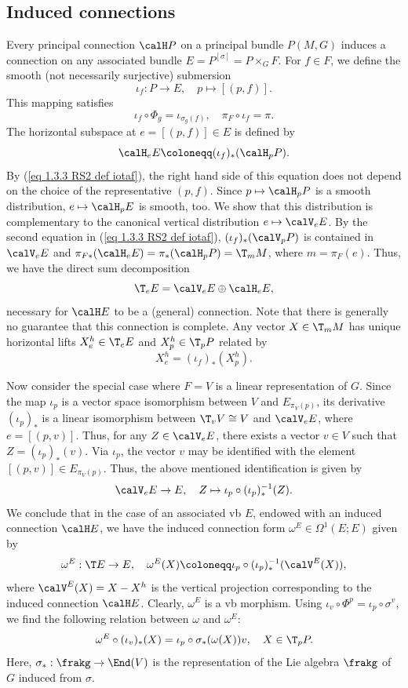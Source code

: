 \subsection{Induced connections}\label{sec: induced connections}


Every principal connection $\calH P$ on a principal bundle $P(M,G)$ induces a connection on any associated bundle $E=P^{[\sigma]}=P\times_G F$. For $f\in F$, we define the smooth (not necessarily surjective) submersion
\[\iota_f:P\to E,\quad p\mapsto [(p,f)].\label{eq 1.3.3 RS2 def iotaf}\]
This mapping satisfies 
\[\iota_f\circ \Phi_g=\iota_{\sigma_g(f)},\quad \pi_F\circ\iota_f=\pi.\]
The horizontal subspace at $e=[(p,f)]\in E$ is defined by
\[\calH_eE\coloneqq (\iota_f)_\ast (\calH_pP).\label{eq 1.3.4 RS2}\]
By (\ref{eq 1.3.3 RS2 def iotaf}), the right hand side of this equation does not depend on the choice of the representative $(p,f)$. Since $p\mapsto \calH_pP$ is a smooth distribution, $e\mapsto \calH_pE$ is smooth, too. We show that this distribution is complementary to the canonical vertical distribution $e\mapsto \calV_eE$. By the second equation in (\ref{eq 1.3.3 RS2 def iotaf}), $(\iota_f)_\ast(\calV_pP)$ is contained in $\calV_eE$ and $\pi_{F\ast}(\calH_eE)=\pi_\ast(\calH_pP)=\T_mM$, where $m=\pi_F(e)$. Thus, we have the direct sum decomposition 
\[\T_eE=\calV_eE\oplus \calH_eE,\]
necessary for $\calH E$ to be a (general) connection. Note that there is generally no guarantee that this connection is complete. Any vector $X\in \T_mM$ has unique horizontal lifts $X_e^h\in \T_eE$ and $X_p^h\in \T_pP$ related by
\[X^h_e=(\iota_f)_\ast(X^h_p).\label{eq 1.3.5 RS2}\]

Now consider the special case where $F=V$ is a linear representation of $G$. Since the map $\iota_p$ is a vector space isomorphism between $V$ and $E_{\pi_V(p)}$, its derivative $(\iota_p)_\ast$ is a linear isomorphism between $\T_vV\cong V$ and $\calV_eE$, where $e=[(p,v)]$. Thus, for any $Z\in \calV_eE$, there exists a vector $v\in V$ such that $Z=(\iota_p)_\ast(v)$. Via $\iota_p$, the vector $v$ may  be identified with the element $[(p,v)]\in E_{\pi_V(p)}$. Thus, the above mentioned identification is given by 
\[\calV_eE\to E,\quad Z\mapsto \iota_p\circ (\iota_p)_\ast^{-1}(Z).\]
We conclude that in the case of an associated \gls{vb} $E$, endowed with an induced connection $\calH E$, we have the induced connection form $\omega^E\in\Omega^1(E;E)$ given by
\[\omega^E:\T E\to E,\quad \omega^E(X)\coloneqq \iota_p\circ (\iota_p)_\ast^{-1}(\calV^E(X)),\label{eq 1.3.9 RS2}\]
where $\calV^E(X)=X-X^h$ is the vertical projection corresponding to the induced connection $\calH E$. Clearly, $\omega^E$ is a \gls{vb} morphism. Using $\iota_v\circ \Phi^p=\iota_p\circ\sigma^v$, we find the following relation between $\omega$ and $\omega^E$:
\[\omega^E\circ (\iota_v)_\ast(X)=\iota_p\circ \sigma_{\ast}(\omega(X))v,\quad X\in \T_pP.\]
Here, $\sigma_{\ast}:\frakg\to \End(V)$ is the representation of the Lie algebra $\frakg$ of $G$ induced from $\sigma$.

